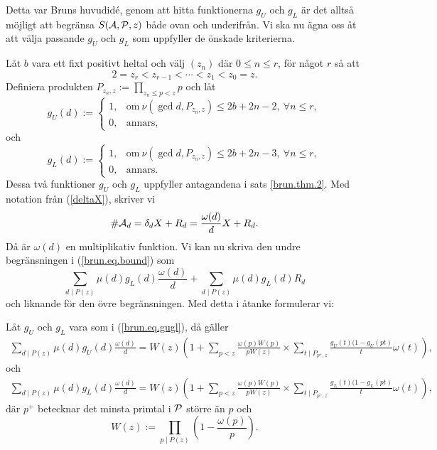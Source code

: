 Detta var Bruns huvudidé, genom att hitta funktionerna $g_U$ och $g_L$ är det alltså möjligt att begränsa $\S{A}{P}{z}$ både ovan och underifrån. Vi ska nu ägna oss åt att välja passande $g_U$ och $g_L$ som uppfyller de önskade kriterierna.

Låt $b$ vara ett fixt positivt heltal och välj $(z_n)$ där $0 \leq n \leq r$, för något $r$ så att
\begin{equation*}
    2 = z_r < z_{r-1} < \cdots < z_1 < z_0 = z.
\end{equation*}
Definiera produkten $P_{z_n, z} := \prod_{z_n \leq p < z} p$ och låt
\begin{equation*}
    g_U(d) :=
    \begin{cases}
        1, & \text{om}\ \nu(\gcd{d, P_{z_n, z}}) \leq 2b+2n-2,\ \forall n \leq r, \\
        0, & \text{annars,}
    \end{cases}
\end{equation*}
och
\begin{equation} \label{brun.eq.gugl}
    g_L(d) :=
    \begin{cases}
        1, & \text{om}\ \nu(\gcd{d, P_{z_n, z}}) \leq 2b+2n-3,\ \forall n \leq r, \\
        0, & \text{annars.}
    \end{cases}
\end{equation}
Dessa två funktioner $g_U$ och $g_L$ uppfyller antagandena i sats \ref{brun.thm.2}. Med notation från (\ref{deltaX}), skriver vi
\begin{equation*} \label{brun.eq.omega}
        \card{\A_d} = \delta_d X + R_d = \frac{\omega(d)}{d} X + R_d.
\end{equation*}
Då är $\omega(d)$ en multiplikativ funktion. Vi kan nu skriva den undre begränsningen i (\ref{brun.eq.bound}) som 
\begin{equation*}
    \sum_{d\mid P(z)}\mu(d)g_L(d)\frac{\omega(d)}{d} +
    \sum_{d \mid P(z)} \mu(d) g_L(d) R_d
\end{equation*}
och liknande för den övre begränsningen. Med detta i åtanke formulerar vi:


\begin{lemma} \label{brun.lem.1}
Låt $g_U$ och $g_L$ vara som i (\ref{brun.eq.gugl}), då gäller
\begin{align*}
    \sum_{d\mid P(z)}\mu(d)g_U(d)\frac{\omega(d)}{d} =
    W(z)\left(1 + \sum_{p<z}\frac{\omega(p)W(p)}{pW(z)} \times \sum_{t\mid P_{p^+,z}}\frac{g_U(t)(1-g_U(pt)}{t}\omega(t)\right),
\end{align*}
och
\begin{align*} \label{brun.eq.sum}
    \sum_{d\mid P(z)}\mu(d)g_L(d)\frac{\omega(d)}{d} =
    W(z)\left(1 + \sum_{p<z}\frac{\omega(p)W(p)}{pW(z)} \times \sum_{t\mid P_{p^+,z}}\frac{g_L(t)(1-g_L(pt)}{t}\omega(t)\right),
\end{align*}
där $p^+$ betecknar det minsta primtal i $\P$ större än $p$ och
\begin{equation*}
    W(z) := \prod_{p\mid P(z)}\left(1 - \frac{\omega(p)}{p} \right).
\end{equation*}
\end{lemma}

